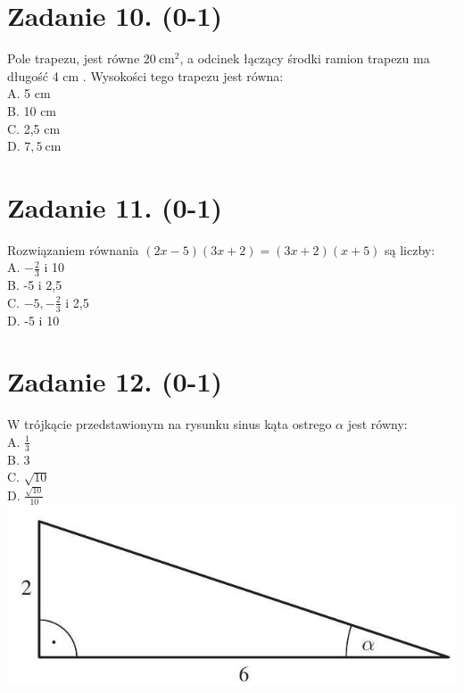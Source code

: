 \documentclass[10pt]{article}
\begin{document}
\section*{Zadanie 10. (0-1)}
Pole trapezu, jest równe \(20 \mathrm{~cm}^{2}\), a odcinek łączący środki ramion trapezu ma długość 4 cm . Wysokości tego trapezu jest równa:\\
A. 5 cm\\
B. 10 cm\\
C. 2,5 cm\\
D. \(7,5 \mathrm{~cm}\)

\section*{Zadanie 11. (0-1)}
Rozwiązaniem równania \((2 x-5)(3 x+2)=(3 x+2)(x+5)\) są liczby:\\
A. \(-\frac{2}{3}\) i 10\\
B. -5 i 2,5\\
C. \(-5,-\frac{2}{3}\) i 2,5\\
D. -5 i 10

\section*{Zadanie 12. (0-1)}
W trójkącie przedstawionym na rysunku sinus kąta ostrego \(\alpha\) jest równy:\\
A. \(\frac{1}{3}\)\\
B. 3\\
C. \(\sqrt{10}\)\\
D. \(\frac{\sqrt{10}}{10}\)\\
\includegraphics[max width=\textwidth, center]{2024_11_21_e15da647cf0a41077ac3g-04(2)}
\end{document}
